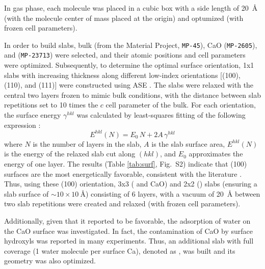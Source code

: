 \documentclass[journal=jpccck,manuscript=article]{achemso}
\begin{document}
In gas phase, each molecule was placed in a cubic box with a side length of \SI{20}{\angstrom} (with the molecule center of mass placed at the origin) and optumized (with frozen cell parameters).

In order to build slabs, bulk  (from the Material Project, \texttt{MP-45}), CaO (\texttt{MP-2605}), and  (\texttt{MP-23713}) were selected, and their atomic positions and cell parameters were optimized. Subsequently, to determine the optimal surface orientation, 1x1 slabs with increasing thickness along different low-index orientations [(100), (110), and (111)] were constructed using ASE \cite{larsenAtomicSimulationEnvironment2017}. The slabs were relaxed with the central two layers frozen to mimic bulk conditions, with the distance between slab repetitions set to 10 times the $c$ cell parameter of the bulk. For each orientation, the surface energy $\gamma^{hkl}$ was calculated by least-squares fitting of the following expression \cite{sunEfficientCreationConvergence2013,tranSurfaceEnergiesElemental2016}:
\begin{equation}
	E^{hkl}(N) = E_0\,N + 2A\,\gamma^{hkl} \label{eq:surf}
\end{equation}
where $N$ is the number of layers in the slab, $A$ is the slab surface area, $E^{hkl}(N)$ is the energy of the relaxed slab cut along $(hkl)$, and $E_0$ approximates the energy of one layer. The results (Table \ref{tab:surf}, Fig.~S2) indicate that (100) surfaces are the most energetically favorable, consistent with the literature \cite{deleeuwDensityFunctionalTheory2000,ebadiInsightsLiMetalOrganic2019}. 
Thus, using these (100) orientation, 3x3 ( and CaO) and 2x2 () slabs (ensuring a slab surface of $\sim 10\times \SI{10}{\angstrom}$) consisting of 6 layers, with a vacuum of \SI{20}{\angstrom} between two slab repetitions were created and relaxed (with frozen cell parameters). 

Additionally, given that it reported to be favorable\cite{deleeuwDensityFunctionalTheory2000,fujimoriInteractionWaterCaO2016a}, the adsorption of water on the CaO surface was investigated. In fact, the contamination of CaO by surface hydroxyls was reported in many experiments\cite{dupinSystematicXPSStudies2000,bebenseeAdsorptionOxygenWater2008,fujimoriInteractionWaterCaO2016a,cristXPSLibraryWebsite2021a}. Thus, an additional slab with full coverage (1 water molecule per surface Ca), denoted as , was built and its geometry was also optimized. 
\end{document}
